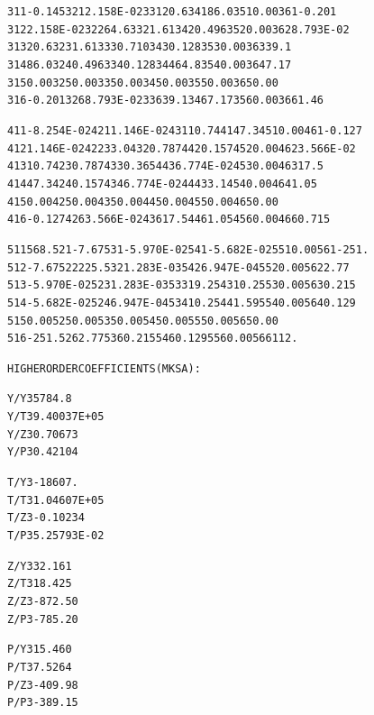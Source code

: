 \begin{tiny}
\begin{alltt}
   3 11 -0.145       3 21  2.158E-02   3 31   20.6       3 41   86.0       3 51   0.00       3 61 -0.201
   3 12  2.158E-02   3 22   64.6       3 32   1.61       3 42  0.496       3 52   0.00       3 62  8.793E-02
   3 13   20.6       3 23   1.61       3 33  0.710       3 43  0.128       3 53   0.00       3 63   39.1
   3 14   86.0       3 24  0.496       3 34  0.128       3 44   64.8       3 54   0.00       3 64   7.17
   3 15   0.00       3 25   0.00       3 35   0.00       3 45   0.00       3 55   0.00       3 65   0.00
   3 16 -0.201       3 26  8.793E-02   3 36   39.1       3 46   7.17       3 56   0.00       3 66   1.46


   4 11 -8.254E-02   4 21  1.146E-02   4 31   10.7       4 41   47.3       4 51   0.00       4 61 -0.127
   4 12  1.146E-02   4 22   33.0       4 32  0.787       4 42  0.157       4 52   0.00       4 62  3.566E-02
   4 13   10.7       4 23  0.787       4 33  0.365       4 43  6.774E-02   4 53   0.00       4 63   17.5
   4 14   47.3       4 24  0.157       4 34  6.774E-02   4 44   33.1       4 54   0.00       4 64   1.05
   4 15   0.00       4 25   0.00       4 35   0.00       4 45   0.00       4 55   0.00       4 65   0.00
   4 16 -0.127       4 26  3.566E-02   4 36   17.5       4 46   1.05       4 56   0.00       4 66  0.715


   5 11   568.       5 21  -7.67       5 31 -5.970E-02   5 41 -5.682E-02   5 51   0.00       5 61  -251.
   5 12  -7.67       5 22   225.       5 32  1.283E-03   5 42  6.947E-04   5 52   0.00       5 62   2.77
   5 13 -5.970E-02   5 23  1.283E-03   5 33   19.2       5 43   10.2       5 53   0.00       5 63  0.215
   5 14 -5.682E-02   5 24  6.947E-04   5 34   10.2       5 44   1.59       5 54   0.00       5 64  0.129
   5 15   0.00       5 25   0.00       5 35   0.00       5 45   0.00       5 55   0.00       5 65   0.00
   5 16  -251.       5 26   2.77       5 36  0.215       5 46  0.129       5 56   0.00       5 66   112.

               HIGHER  ORDER  COEFFICIENTS  ( MKSA ):

           Y/Y3            5784.8
           Y/T3           9.40037E+05
           Y/Z3           0.70673
           Y/P3           0.42104

           T/Y3           -18607.
           T/T3           1.04607E+05
           T/Z3          -0.10234
           T/P3           5.25793E-02

           Z/Y3            32.161
           Z/T3            18.425
           Z/Z3           -872.50
           Z/P3           -785.20

           P/Y3            15.460
           P/T3            7.5264
           P/Z3           -409.98
           P/P3           -389.15
\end{alltt}

\end{tiny}


